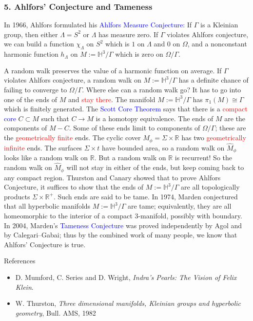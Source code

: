 \documentclass{beamer}
\def\R{\mathbb{R}}
\def\H{\mathbb{H}}
\begin{document}
\frame
{
\frametitle{5. Ahlfors' Conjecture and Tameness}
In 1966, Ahlfors formulated his
\vskip 10pt
\textcolor{blue}{Ahlfors Measure Conjecture:} If $\Gamma$ is a Kleinian group, then either
$\Lambda=S^2$ or $\Lambda$ has measure zero.
\vskip 10pt
If $\Gamma$ violates Ahlfors conjecture, we can build a function $\chi_\Lambda$ on $S^2$
which is $1$ on $\Lambda$ and $0$ on $\Omega$, and a nonconstant harmonic function
$h_\Lambda$ on $M:=\H^3/\Gamma$ which is zero on $\Omega/\Gamma$.
}
\frame
{
A random walk preserves the value of a harmonic function \textcolor{dgreen}{on average}.
If $\Gamma$ violates Ahlfors conjecture, a random walk on $M:=\H^3/\Gamma$ has
a definite chance of failing to converge to $\Omega/\Gamma$.
\vskip 10pt
Where else can a random walk go? It has to go into one of the \textcolor{dgreen}{ends} of $M$
and \textcolor{red}{stay there}.
}
\frame
{
The manifold $M:=\H^3/\Gamma$ has $\pi_1(M)\cong\Gamma$ which is finitely generated.
\vskip 10pt
The \textcolor{blue}{Scott Core Theorem} says that there is a \textcolor{red}{compact}
\textcolor{blue}{core}
$C \subset M$ such that $C \to M$ is a homotopy equivalence.
\vskip 10pt
The \textcolor{dgreen}{ends} of $M$ are the components of $M-C$.
\vskip 10pt
Some of these ends limit to components of $\Omega/\Gamma$; these are the 
\textcolor{red}{geometrically finite} ends.
}
\frame
{
The cyclic cover $\widehat{M}_\phi=\Sigma \times \R$ has two \textcolor{red}{geometrically
infinite} ends. The surfaces $\Sigma \times t$ have bounded area, 
so a random walk on $\widehat{M}_\phi$ looks like a random walk on $\R$.
\vskip 10pt
But a random walk on $\R$ is recurrent! So the random walk on $\widehat{M}_\phi$ will not
stay in either of the ends, but keep coming back to any compact region.
}
\frame
{
Thurston and Canary showed that to prove Ahlfors Conjecture, it suffices to show that the
ends of $M:=\H^3/\Gamma$ are all topologically products $\Sigma \times \R^+$. Such ends
are said to be \textcolor{dgreen}{tame}.
\vskip 10pt
In 1974, Marden conjectured that all hyperbolic manifolds $M:=\H^3/\Gamma$ are 
\textcolor{dgreen}{tame}; equivalently, they are all homeomorphic to the interior of a
compact 3-manifold, possibly with boundary.
\vskip 10pt
In 2004, Marden's \textcolor{blue}{Tameness Conjecture} was proved independently by
Agol and by Calegari--Gabai; thus by the combined work of many people,
we know that Ahlfors' Conjecture is true.
}
\frame
{
\begin{block}{References}
\begin{itemize}
\item{D. Mumford, C. Series and D. Wright, {\em Indra's Pearls: The Vision of Felix Klein}.}
\item{W. Thurston, {\em Three dimensional manifolds, Kleinian groups and hyperbolic geometry},
Bull. AMS, 1982}
\end{itemize}
\end{block}
}
\end{document}
